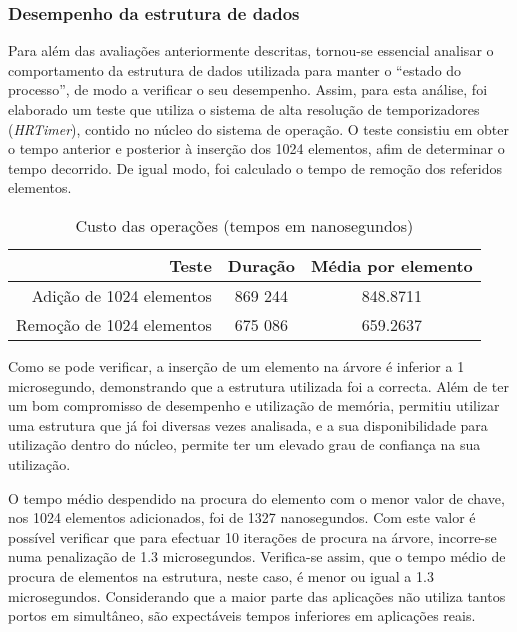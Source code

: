 \subsubsection{Desempenho da estrutura de dados}

Para além das avaliações anteriormente descritas, tornou-se essencial analisar o comportamento da estrutura de dados utilizada para manter o “estado do processo”, de modo a verificar o seu desempenho. 
 Assim, para esta análise, foi elaborado um teste que utiliza o sistema de alta resolução de temporizadores (\textit{HRTimer}), contido no núcleo do sistema de operação.
 O teste consistiu em obter o tempo anterior e posterior à inserção dos 1024 elementos, afim de determinar o tempo decorrido.
 De igual modo, foi calculado o tempo de remoção dos referidos elementos.

\begin{table}
\begin{center}
\caption{Custo das operações (tempos em nanosegundos)}
\begin{tabular}{ | r | c | c | }
\hline
\hspace{1cm} Teste \hspace{1.5cm} & \hspace{1cm}Duração\hspace{1cm} &  Média por
elemento \\
\hline
Adição de 1024 elementos & 869 244 & 848.8711 \\
\hline
Remoção de 1024 elementos & 675 086 & 659.2637\\
\hline

\hline
\end{tabular}
\label{tab:tree_info}
\end{center}
\end{table}

Como se pode verificar, a inserção de um elemento na árvore é inferior a 1 microsegundo, demonstrando que a estrutura utilizada foi a correcta.
 Além de ter um bom compromisso de desempenho e utilização de memória, permitiu utilizar uma estrutura que já foi diversas vezes analisada, e a sua disponibilidade para utilização dentro do núcleo, permite ter um elevado grau de confiança na sua utilização.

O tempo médio despendido na procura do elemento com o menor valor de chave, nos 1024 elementos adicionados, foi de 1327 nanosegundos.
 Com este valor é possível verificar que para efectuar 10 iterações de procura na árvore, incorre-se numa penalização de 1.3 microsegundos. 
 Verifica-se assim, que o tempo médio de procura de elementos na estrutura, neste caso, é menor ou igual a 1.3 microsegundos.
 Considerando que a maior parte das aplicações não utiliza tantos portos em simultâneo, são expectáveis tempos inferiores em aplicações reais.

